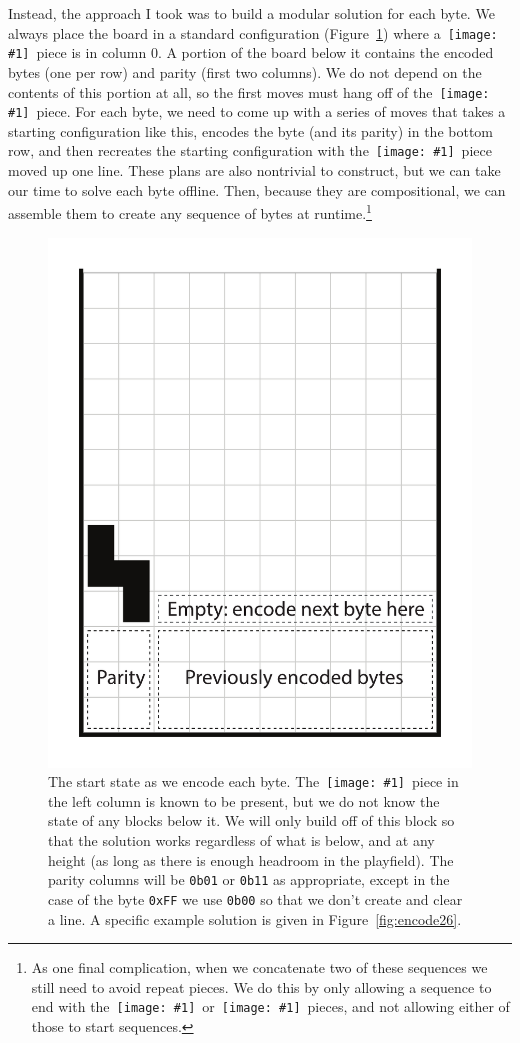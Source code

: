 \documentclass[twocolumn]{article}
\newcommand\tetrispiece[1]{\,\texttt{[image: \#1]}\hspace{0.1em}}
\newcommand\ihoriz{\tetrispiece{i_horiz}}
\newcommand\shoriz{\tetrispiece{s_horiz}}
\newcommand\svert{\tetrispiece{s_vert}}
\begin{document}
Instead, the approach I took was to build a modular solution for each
byte. We always place the board in a standard configuration
(Figure~\ref{fig:encodingscheme}) where a \svert\ piece is in column
0. A portion of the board below it contains the encoded bytes (one per
row) and parity (first two columns). We do not depend on the contents
of this portion at all, so the first moves must hang off of the
\svert\ piece. For each byte, we need to come up with a series of
moves that takes a starting configuration like this, encodes the byte
(and its parity) in the bottom row, and then recreates the starting
configuration with the \svert\ piece moved up one line. These plans
are also nontrivial to construct, but we can take our time to solve
each byte offline. Then, because they are compositional, we can assemble
them to create any sequence of bytes at runtime.\footnote{
  As one final complication, when we concatenate two of these sequences
  we still need to avoid repeat pieces. We do this by only allowing a
  sequence to end with the \shoriz\ or \ihoriz\ pieces, and not
  allowing either of those to start sequences.}

\begin{figure}
  \centering
  \includegraphics[width=0.6 \linewidth]{encodingscheme}
  \caption{
    The start state as we encode each byte. The \svert\ piece in the
    left column is known to be present, but we do not know the state
    of any blocks below it. We will only build off of this block so
    that the solution works regardless of what is below, and at
    any height (as long as there is enough headroom in the playfield).
    The parity columns will be {\tt 0b01} or {\tt 0b11} as appropriate,
    except in the case of the byte {\tt 0xFF} we use {\tt 0b00} so that
    we don't create and clear a line.
    A specific example solution is given in Figure~\ref{fig:encode26}.
    } \label{fig:encodingscheme}
\end{figure}
\end{document}

